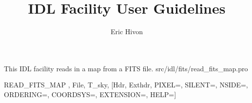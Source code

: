




\renewcommand{\facname}{{read\_fits\_map }}
\renewcommand{\FACNAME}{{READ\_FITS\_MAP }}
\sloppy



\title{\healpix IDL Facility User Guidelines}
 \section[read\_fits\_map]{ }
\label{idl:read_fits_map}
\author{Eric Hivon}




\begin{facility}
{This IDL facility reads in a \healpix map from a FITS file.}
{src/idl/fits/read\_fits\_map.pro}
\end{facility}

\begin{IDLformat}
{\FACNAME, File, T\_sky, [Hdr, Exthdr, PIXEL=, SILENT=, NSIDE=, ORDERING=,
COORDSYS=, EXTENSION=, HELP=]
}
\end{IDLformat}

